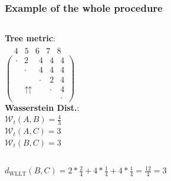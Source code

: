 \begin{frame}
\frametitle{Example of the whole procedure}
\begin{columns}[T]%
	\textbf{Tree metric}:\\
	$\begin{array}{ccccc}
	\ \ \; \textit{4} & \textit{5} & \textit{6} & \textit{7} & \textit{8}
	\end{array}$\\
	$
	\left(		
	\begin{array}{ccccc}
	\cdot & 2 & 4 & 4 & 4 \\
	& \cdot & 4 & 4 & 4 \\
	&   & \cdot & 2 & 4 \\
	& \upuparrows & & \cdot & 4\\
	&   &   &   & \cdot
	\end{array}
	\right)
	$\\
	\textbf{Wasserstein Dist.}:\\
	$\mathcal{W}_{t}(A,B) = \frac{4}{3}$\\
	$\mathcal{W}_{t}(A,C) = 3$\\
	$\mathcal{W}_{t}(B,C) = 3$\\
\end{columns}
\vspace{0.5cm}
$d_{\text{WLLT}}(B,C) = 2*\frac{2}{4} + 4*\frac{1}{4} + 4*\frac{1}{4} = \frac{12}{4} = 3$
\end{frame}

